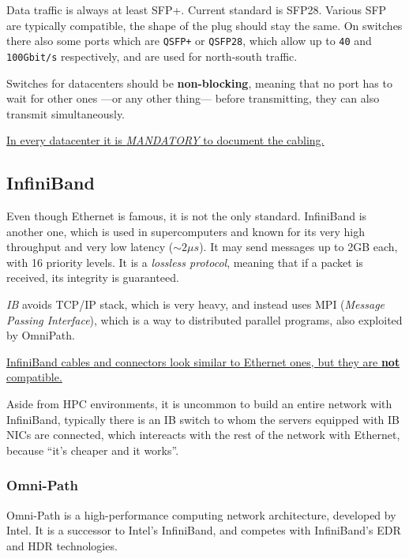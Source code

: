 
Data traffic is always at least SFP+.
Current standard is SFP28. Various SFP are typically compatible, the shape of the plug should stay the same.
On switches there also some ports which are \texttt{QSFP+} or \texttt{QSFP28}, which allow up to \texttt{40} and \texttt{100Gbit/s} respectively, and are used for north-south traffic.\ns
{}

Switches for datacenters should be \textbf{non-blocking}, meaning that no port has to wait for other ones ---or any other thing--- before transmitting, they can also transmit simultaneously.
\nl

\ul{In every datacenter it is \textit{MANDATORY} to document the cabling.}

\subsection{InfiniBand}
\label{sec:infiniband}
Even though Ethernet is famous, it is not the only standard. InfiniBand is another one, which is used in supercomputers and known for its very high throughput and very low latency ($\sim 2\mu s$).
It may send messages up to 2GB each, with 16 priority levels.
It is a \textit{lossless protocol}, meaning that if a packet is received, its integrity is guaranteed.

\textit{IB} avoids TCP/IP stack, which is very heavy, and instead uses MPI (\textit{Message Passing Interface}), which is a way to distributed parallel programs, also exploited by OmniPath.

\ul{InfiniBand cables and connectors look similar to Ethernet ones, but they are \textbf{not} compatible.}

Aside from HPC environments, it is uncommon to build an entire network with InfiniBand, typically there is an IB switch to whom the servers equipped with IB NICs are connected, which intereacts with the rest of the network with Ethernet, because ``it's cheaper and it works''.

\subsubsection{Omni-Path}
Omni-Path is a high-performance computing network architecture, developed by Intel. It is a successor to Intel's InfiniBand, and competes with InfiniBand's EDR and HDR technologies.

